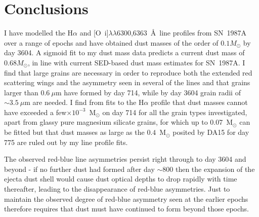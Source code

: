 \section{Conclusions}


I have modelled the H$\alpha$ and [O~{\sc i}]$\lambda\lambda$6300,6363~\AA\ 
line profiles from SN~1987A over a range of epochs and have obtained dust 
masses of the order of $0.1M_{\odot}$ by day 3604.  A sigmoid 
fit to my dust mass data predicts a current dust mass of 
0.68$M_{\odot}$, in line with current SED-based dust mass estimates for 
SN~1987A.  I find that large grains are necessary in order to reproduce 
 both the extended red scattering wings and the asymmetry seen in 
several of the lines and that grains larger than $0.6~\mu$m have formed by 
day 714, while by day 3604 grain radii of $\sim 3.5~\mu$m are needed. I 
find from fits to the H$\alpha$ profile that dust masses cannot have 
exceeded a few$\times10^{-3}$~M$_\odot$ on day 714 for all the grain types 
investigated, apart from glassy pure magnesium silicate grains, for which 
up to 0.07~M$_{\odot}$ can be fitted but that dust masses as large as the $0.4$~M$_{\odot}$ posited by DA15 for day 775 are ruled out by my line profile fits.

The observed red-blue line asymmetries persist right through to day 3604 
and beyond - if no further dust had formed after day $\sim$800 then the 
expansion of the ejecta  dust shell would cause dust optical depths 
to drop rapidly with time thereafter, leading to the disappearance of 
red-blue asymmetries. Just to maintain the observed degree of red-blue 
asymmetry seen at the earlier epochs therefore requires that dust must 
have continued to form beyond those epochs.

